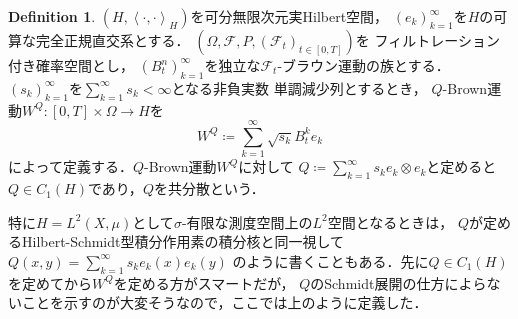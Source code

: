 \documentclass[dvipdfmx,autodetect-engine]{jsarticle}
\theoremstyle{remark}
\theoremstyle{definition}
\newtheorem{definition}{Definition}[section]
\newcommand{\iprod}[1]{\left\langle #1 \right\rangle}
\begin{document}
\begin{definition}
    $(H,\iprod{\cdot,\cdot}_{H})$を可分無限次元実Hilbert空間，
    $(e_{k})_{k=1}^{\infty}$を$H$の可算な完全正規直交系とする．
    $(\Omega,\mathcal{F},P,(\mathcal{F}_{t})_{t\in [0,T]})$を
    フィルトレーション付き確率空間とし，
    $(B_{t}^{n})_{k=1}^{\infty}$を独立な$\mathcal{F}_{t}$-ブラウン運動の族とする．
    $(s_{k})_{k=1}^{\infty}$を$\sum_{k=1}^{\infty} s_{k} < \infty$となる非負実数
    単調減少列とするとき，
    $Q$-Brown運動$W^{Q}\colon [0,T] \times \Omega \to H$を
    \begin{equation}
        W^{Q} \coloneqq \sum_{k=1}^{\infty} \sqrt{s_{k}} B_{t}^{k} e_{k}
    \end{equation}
    によって定義する．$Q$-Brown運動$W^{Q}$に対して
    $Q \coloneqq \sum_{k=1}^{\infty} s_{k} e_{k} \otimes e_{k}$と定めると
    $Q \in C_{1}(H)$であり，$Q$を共分散という．
\end{definition}


特に$H = L^{2}(X,\mu)$として$\sigma$-有限な測度空間上の$L^2$空間となるときは，
$Q$が定めるHilbert-Schmidt型積分作用素の積分核と同一視して
$Q(x,y) = \sum_{k=1}^{\infty} s_{k} e_{k}(x)e_{k}(y)$
のように書くこともある．先に$Q\in C_{1}(H)$を定めてから$W^{Q}$を定める方がスマートだが，
$Q$のSchmidt展開の仕方によらないことを示すのが大変そうなので，ここでは上のように定義した．
\end{document}
